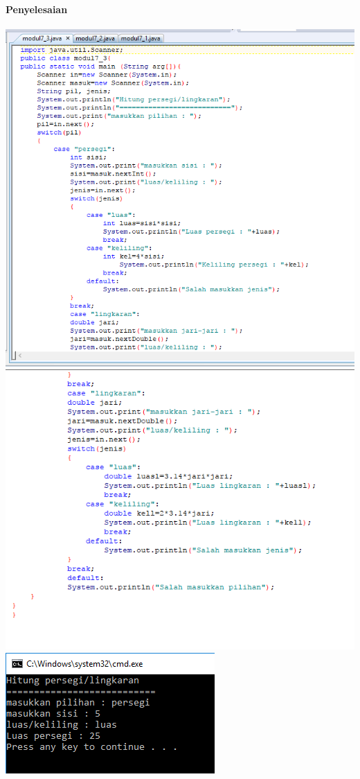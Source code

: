 \documentclass[a4paper,12pt]{article}
\begin{document}
\paragraph{Penyelesaian\\}
\includegraphics[width=\linewidth]{image--007}\\
\includegraphics[width=\linewidth]{image--008}\\
\includegraphics[scale=.6]{image--009}
\end{document}

